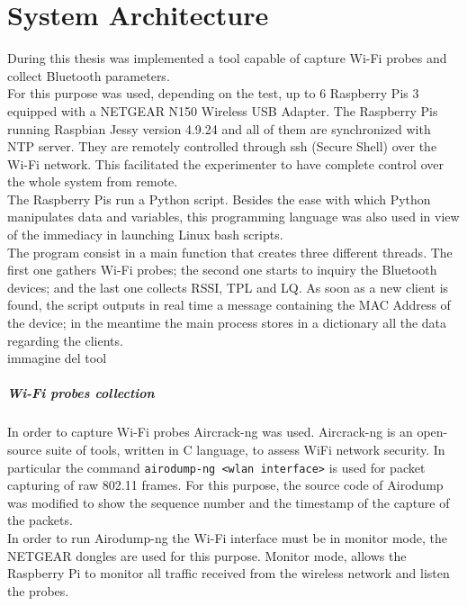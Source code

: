 \chapter{System Architecture}
\label{Chapter 4}
\thispagestyle{empty}
During this thesis was implemented a tool capable of capture Wi-Fi probes and collect Bluetooth parameters.\\
For this purpose was used, depending on the test, up to 6 Raspberry Pis 3 equipped with a NETGEAR N150 Wireless USB Adapter. The Raspberry Pis running Raspbian Jessy version 4.9.24 and all of them are synchronized with NTP server. They are remotely controlled through ssh (Secure Shell) over the Wi-Fi network. This facilitated the experimenter to have complete control over the whole system from remote.\\
\linebreak
The Raspberry Pis run a Python script. Besides the ease with which Python manipulates data and variables, this programming language was also used in view of the immediacy in launching Linux bash scripts.\\
\linebreak
The program consist in a main function that creates three different threads. The first one gathers Wi-Fi probes; the second one starts to inquiry the Bluetooth devices; and the last one collects RSSI, TPL and LQ. As soon as a new client is found, the script outputs in real time a message containing the MAC Address of the device; in the meantime the main process stores in a dictionary all the data regarding the clients.\\
\linebreak
immagine del tool

\paragraph{Wi-Fi probes collection}
In order to capture Wi-Fi probes Aircrack-ng was used. Aircrack-ng is an open-source suite of tools, written in C language, to assess WiFi network security. In particular the command \texttt{airodump-ng \textless wlan interface\textgreater} is used for packet capturing of raw 802.11 frames. For this purpose, the source code of Airodump was modified to show the sequence number and the timestamp of the capture of the packets.\\
In order to run Airodump-ng the Wi-Fi interface must be in monitor mode, the NETGEAR dongles are used for this purpose. Monitor mode, allows the Raspberry Pi to monitor all traffic received from the wireless network and listen the probes.



